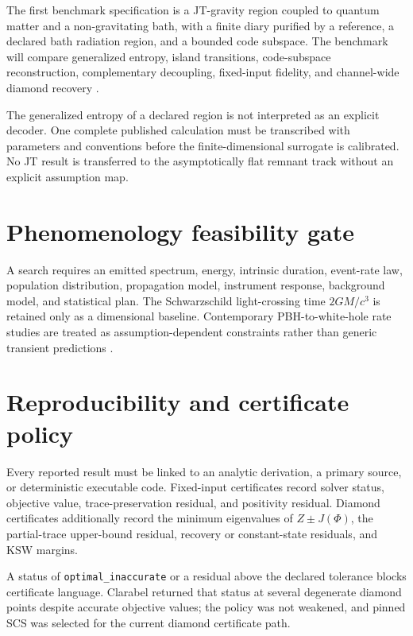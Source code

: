 \documentclass[11pt]{article}
\begin{document}
The first benchmark specification is a JT-gravity region coupled to quantum matter and a non-gravitating bath, with a finite diary purified by a reference, a declared bath radiation region, and a bounded code subspace. The benchmark will compare generalized entropy, island transitions, code-subspace reconstruction, complementary decoupling, fixed-input fidelity, and channel-wide diamond recovery \citep{Penington2019,AlmheiriEtAl2019Bulk,AlmheiriEtAl2019Replica}.

The generalized entropy of a declared region is not interpreted as an explicit decoder. One complete published calculation must be transcribed with parameters and conventions before the finite-dimensional surrogate is calibrated. No JT result is transferred to the asymptotically flat remnant track without an explicit assumption map.

\section{Phenomenology feasibility gate}
\label{sec:phenomenology}

A search requires an emitted spectrum, energy, intrinsic duration, event-rate law, population distribution, propagation model, instrument response, background model, and statistical plan. The Schwarzschild light-crossing time $2GM/c^3$ is retained only as a dimensional baseline. Contemporary PBH-to-white-hole rate studies are treated as assumption-dependent constraints rather than generic transient predictions \citep{EwasiukProfumo2026}.

\section{Reproducibility and certificate policy}
\label{sec:reproducibility}

Every reported result must be linked to an analytic derivation, a primary source, or deterministic executable code. Fixed-input certificates record solver status, objective value, trace-preservation residual, and positivity residual. Diamond certificates additionally record the minimum eigenvalues of $Z\pm J(\Phi)$, the partial-trace upper-bound residual, recovery or constant-state residuals, and KSW margins.

A status of \texttt{optimal\_inaccurate} or a residual above the declared tolerance blocks certificate language. Clarabel returned that status at several degenerate diamond points despite accurate objective values; the policy was not weakened, and pinned SCS was selected for the current diamond certificate path.
\end{document}
